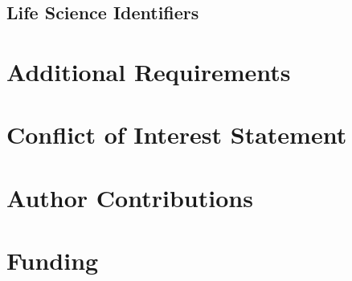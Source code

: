 \documentclass[utf8]{frontiersSCNS} %
\begin{document}
\subsection{Life Science Identifiers}


\section{Additional Requirements}


\section*{Conflict of Interest Statement}


\section*{Author Contributions}


\section*{Funding}
\end{document}
